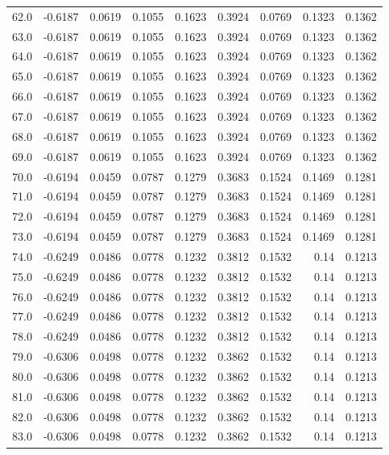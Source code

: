 \begin{longtable}{lrrrrrrrr}
62.0 & -0.6187 & 0.0619 & 0.1055 & 0.1623 & 0.3924 & 0.0769 & 0.1323 & 0.1362 \\
63.0 & -0.6187 & 0.0619 & 0.1055 & 0.1623 & 0.3924 & 0.0769 & 0.1323 & 0.1362 \\
64.0 & -0.6187 & 0.0619 & 0.1055 & 0.1623 & 0.3924 & 0.0769 & 0.1323 & 0.1362 \\
65.0 & -0.6187 & 0.0619 & 0.1055 & 0.1623 & 0.3924 & 0.0769 & 0.1323 & 0.1362 \\
66.0 & -0.6187 & 0.0619 & 0.1055 & 0.1623 & 0.3924 & 0.0769 & 0.1323 & 0.1362 \\
67.0 & -0.6187 & 0.0619 & 0.1055 & 0.1623 & 0.3924 & 0.0769 & 0.1323 & 0.1362 \\
68.0 & -0.6187 & 0.0619 & 0.1055 & 0.1623 & 0.3924 & 0.0769 & 0.1323 & 0.1362 \\
69.0 & -0.6187 & 0.0619 & 0.1055 & 0.1623 & 0.3924 & 0.0769 & 0.1323 & 0.1362 \\
70.0 & -0.6194 & 0.0459 & 0.0787 & 0.1279 & 0.3683 & 0.1524 & 0.1469 & 0.1281 \\
71.0 & -0.6194 & 0.0459 & 0.0787 & 0.1279 & 0.3683 & 0.1524 & 0.1469 & 0.1281 \\
72.0 & -0.6194 & 0.0459 & 0.0787 & 0.1279 & 0.3683 & 0.1524 & 0.1469 & 0.1281 \\
73.0 & -0.6194 & 0.0459 & 0.0787 & 0.1279 & 0.3683 & 0.1524 & 0.1469 & 0.1281 \\
74.0 & -0.6249 & 0.0486 & 0.0778 & 0.1232 & 0.3812 & 0.1532 & 0.14 & 0.1213 \\
75.0 & -0.6249 & 0.0486 & 0.0778 & 0.1232 & 0.3812 & 0.1532 & 0.14 & 0.1213 \\
76.0 & -0.6249 & 0.0486 & 0.0778 & 0.1232 & 0.3812 & 0.1532 & 0.14 & 0.1213 \\
77.0 & -0.6249 & 0.0486 & 0.0778 & 0.1232 & 0.3812 & 0.1532 & 0.14 & 0.1213 \\
78.0 & -0.6249 & 0.0486 & 0.0778 & 0.1232 & 0.3812 & 0.1532 & 0.14 & 0.1213 \\
79.0 & -0.6306 & 0.0498 & 0.0778 & 0.1232 & 0.3862 & 0.1532 & 0.14 & 0.1213 \\
80.0 & -0.6306 & 0.0498 & 0.0778 & 0.1232 & 0.3862 & 0.1532 & 0.14 & 0.1213 \\
81.0 & -0.6306 & 0.0498 & 0.0778 & 0.1232 & 0.3862 & 0.1532 & 0.14 & 0.1213 \\
82.0 & -0.6306 & 0.0498 & 0.0778 & 0.1232 & 0.3862 & 0.1532 & 0.14 & 0.1213 \\
83.0 & -0.6306 & 0.0498 & 0.0778 & 0.1232 & 0.3862 & 0.1532 & 0.14 & 0.1213 \\

\end{longtable}
